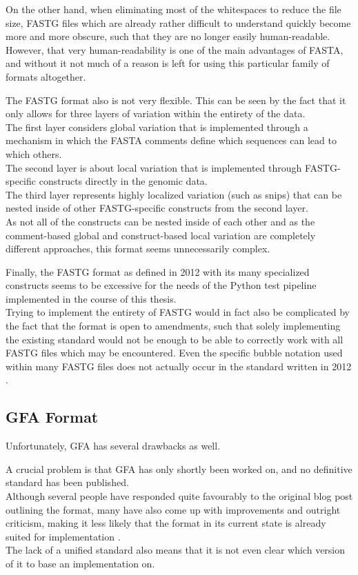 \documentclass[a4paper,12pt,twoside,BCOR=10mm]{scrbook}
\begin{document}
On the other hand, when eliminating most of the whitespaces to reduce the file size, 
FASTG files which are already rather difficult to understand quickly 
become more and more obscure, such that they are no longer easily human-readable. 
However, that very human-readability is one of the main advantages of FASTA, 
and without it not much of a reason is left for using this particular family 
of formats altogether.

The FASTG format also is not very flexible. This can be seen by the fact that 
it only allows for three layers of variation within the entirety of the data. \\
The first layer considers global variation that is implemented through a mechanism in which the 
FASTA comments define which sequences can lead to which others. \\
The second layer is about local variation that is implemented through FASTG-specific constructs 
directly in the genomic data. \\
The third layer represents highly localized variation (such as snips) that can be nested 
inside of other FASTG-specific constructs from the second layer. \\
As not all of the constructs can be nested inside of each other 
and as the comment-based global and construct-based local 
variation are completely different approaches, this format 
seems unnecessarily complex.

Finally, the FASTG format as defined in 2012 with 
its many specialized constructs seems to be excessive for 
the needs of the Python test pipeline implemented in the course of this thesis. \\
Trying to implement the entirety of FASTG would in fact 
also be complicated by the fact that the format is open to amendments, 
such that solely implementing the existing standard would not be enough 
to be able to correctly work with all FASTG files which may be encountered. 
Even the specific bubble notation used within many FASTG files 
does not actually occur in the standard written in 2012 \citep{specGFA1,specFASTG}.

\subsection{GFA Format}

Unfortunately, GFA has several drawbacks as well.

A crucial problem is that GFA has only shortly been worked on, 
and no definitive standard has been published. \\
Although several people have responded quite favourably to the original blog post 
outlining the format, many have also come up with improvements and outright criticism, 
making it less likely that the format in its current state 
is already suited for implementation \citep{knightGFA1}. \\
The lack of a unified standard also means that it is not even clear which version of it 
to base an implementation on.
\end{document}
